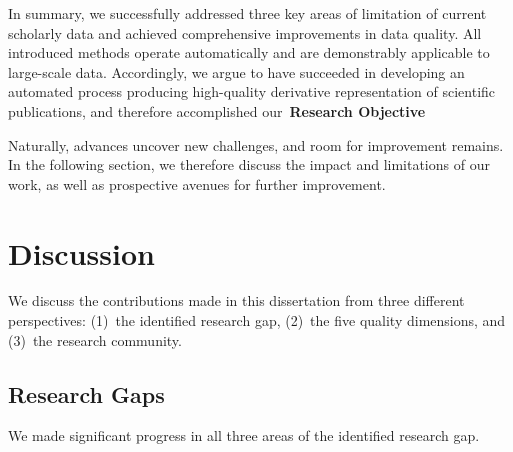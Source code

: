 In summary, we successfully addressed three key areas of limitation of current scholarly data and achieved comprehensive improvements in data quality. All introduced methods operate automatically and are demonstrably applicable to large-scale data. %
Accordingly, we argue to have succeeded in developing an automated process producing high-quality derivative representation of scientific publications, and therefore accomplished our \textbf{{\color{objblue-box}\faCrosshairs}\,Research Objective \large\checkmark}

Naturally, advances uncover new challenges, and room for improvement remains. In the following section, we therefore discuss the impact and limitations of our work, as well as prospective avenues for further improvement.


\section{Discussion}

We discuss the contributions made in this dissertation from three different perspectives: (1)~the identified research gap, (2)~the five quality dimensions, and (3)~the research community.


\subsection{Research Gaps}\label{sec:discussion-rgap}
We made significant progress in all three areas of the identified research gap.

